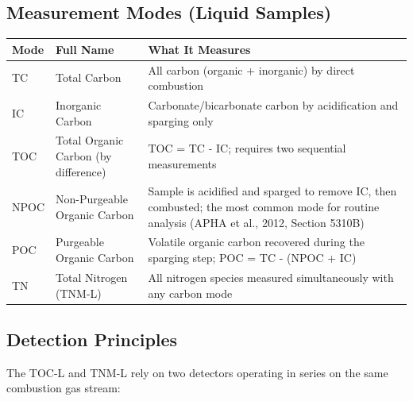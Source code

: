 \documentclass[
  11pt,
  letterpaper,
]{article}
\newcounter{none} %
\begin{document}
\subsection{Measurement Modes (Liquid
Samples)}\label{measurement-modes-liquid-samples}

{\def\LTcaptype{none} %
\begin{longtable}[]{@{}
  >{\raggedright\arraybackslash}p{}
  >{\raggedright\arraybackslash}p{}
  >{\raggedright\arraybackslash}p{}@{}}
\toprule\noalign{}
\begin{minipage}[b]{\linewidth}\raggedright
Mode
\end{minipage} & \begin{minipage}[b]{\linewidth}\raggedright
Full Name
\end{minipage} & \begin{minipage}[b]{\linewidth}\raggedright
What It Measures
\end{minipage} \\
\midrule\noalign{}
\endhead
\bottomrule\noalign{}
\endlastfoot
TC & Total Carbon & All carbon (organic + inorganic) by direct
combustion \\
IC & Inorganic Carbon & Carbonate/bicarbonate carbon by acidification
and sparging only \\
TOC & Total Organic Carbon (by difference) & TOC = TC - IC; requires two
sequential measurements \\
NPOC & Non-Purgeable Organic Carbon & Sample is acidified and sparged to
remove IC, then combusted; the most common mode for routine analysis
(APHA et al., 2012, Section 5310B) \\
POC & Purgeable Organic Carbon & Volatile organic carbon recovered
during the sparging step; POC = TC - (NPOC + IC) \\
TN & Total Nitrogen (TNM-L) & All nitrogen species measured
simultaneously with any carbon mode \\
\end{longtable}
}

\subsection{Detection Principles}\label{detection-principles}

The TOC-L and TNM-L rely on two detectors operating in series on the
same combustion gas stream:
\end{document}
